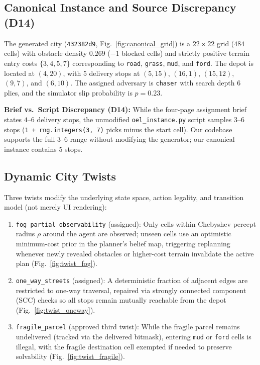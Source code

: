 \documentclass[conference]{IEEEtran}
\begin{document}
\subsection{Canonical Instance and Source Discrepancy (D14)}
The generated city (\texttt{432382d9}, Fig.~\ref{fig:canonical_grid}) is a $22 \times 22$ grid ($484$ cells) with obstacle density $0.269$ ($-1$ blocked cells) and strictly positive terrain entry costs $\{3, 4, 5, 7\}$ corresponding to \texttt{road}, \texttt{grass}, \texttt{mud}, and \texttt{ford}. The depot is located at $(4, 20)$, with $5$ delivery stops at $(5,15)$, $(16,1)$, $(15,12)$, $(9,7)$, and $(6,10)$. The assigned adversary is \texttt{chaser} with search depth $6$ plies, and the simulator slip probability is $p = 0.23$.

\textbf{Brief vs.\ Script Discrepancy (D14):} While the four-page assignment brief states $4$--$6$ delivery stops, the unmodified \texttt{oel\_instance.py} script samples $3$--$6$ stops (\texttt{1 + rng.integers(3, 7)} picks minus the start cell). Our codebase supports the full $3$--$6$ range without modifying the generator; our canonical instance contains $5$ stops.

\subsection{Dynamic City Twists}
Three twists modify the underlying state space, action legality, and transition model (not merely UI rendering):
\begin{enumerate}
    \item \texttt{fog\_partial\_observability} (assigned): Only cells within Chebyshev percept radius $\rho$ around the agent are observed; unseen cells use an optimistic minimum-cost prior in the planner's belief map, triggering replanning whenever newly revealed obstacles or higher-cost terrain invalidate the active plan (Fig.~\ref{fig:twist_fog}).
    \item \texttt{one\_way\_streets} (assigned): A deterministic fraction of adjacent edges are restricted to one-way traversal, repaired via strongly connected component (SCC) checks so all stops remain mutually reachable from the depot (Fig.~\ref{fig:twist_oneway}).
    \item \texttt{fragile\_parcel} (approved third twist): While the fragile parcel remains undelivered (tracked via the delivered bitmask), entering \texttt{mud} or \texttt{ford} cells is illegal, with the fragile destination cell exempted if needed to preserve solvability (Fig.~\ref{fig:twist_fragile}).
\end{enumerate}
\end{document}
